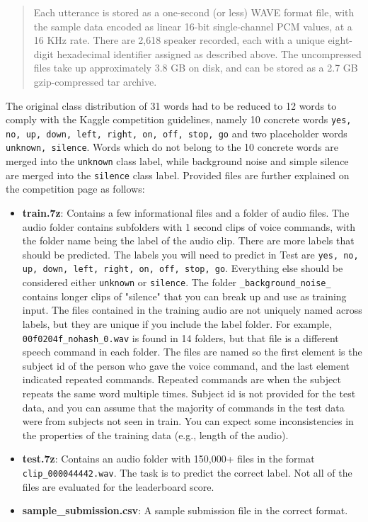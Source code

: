 \documentclass{article}
\theoremstyle{definition}
\theoremstyle{remark}
\begin{document}
\begin{quote}
Each utterance is stored as a one-second (or less) WAVE format file, with the sample data encoded as linear 16-bit single-channel PCM values, at a 16 KHz rate. There are 2,618 speaker recorded, each with a unique eight-digit hexadecimal identifier assigned as described above. The uncompressed files take up approximately 3.8 GB on disk, and can be stored as a 2.7 GB gzip-compressed tar archive.
\end{quote}

The original class distribution of 31 words had to be reduced to 12 words to comply with the Kaggle competition guidelines, namely 10 concrete words \texttt{yes, no, up, down, left, right, on, off, stop, go} and two placeholder words \texttt{unknown, silence}. Words which do not belong to the 10 concrete words are merged into the \texttt{unknown} class label, while background noise and simple silence are merged into the \texttt{silence} class label. Provided files are further explained on the competition page \cite{kaggle_challenge} as follows:

\begin{itemize}
	\item \textbf{train.7z}: Contains a few informational files and a folder of audio files. The audio folder contains subfolders with 1 second clips of voice commands, with the folder name being the label of the audio clip. There are more labels that should be predicted. The labels you will need to predict in Test are \texttt{yes, no, up, down, left, right, on, off, stop, go}. Everything else should be considered either \texttt{unknown} or \texttt{silence}. The folder \texttt{\_background\_noise\_} contains longer clips of "silence" that you can break up and use as training input. The files contained in the training audio are not uniquely named across labels, but they are unique if you include the label folder. For example, \texttt{00f0204f\_nohash\_0.wav} is found in 14 folders, but that file is a different speech command in each folder. The files are named so the first element is the subject id of the person who gave the voice command, and the last element indicated repeated commands. Repeated commands are when the subject repeats the same word multiple times. Subject id is not provided for the test data, and you can assume that the majority of commands in the test data were from subjects not seen in train. You can expect some inconsistencies in the properties of the training data (e.g., length of the audio).
	\item \textbf{test.7z}: Contains an audio folder with 150,000+ files in the format \texttt{clip\_000044442.wav}. The task is to predict the correct label. Not all of the files are evaluated for the leaderboard score.
	\item \textbf{sample\_submission.csv}: A sample submission file in the correct format.
\end{itemize}
\end{document}
